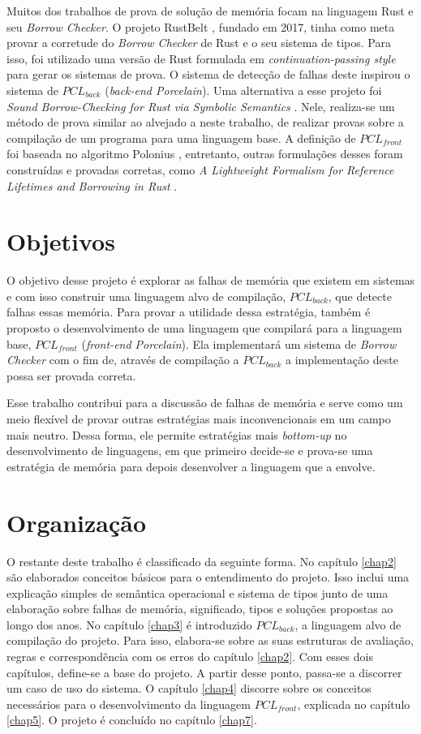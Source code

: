 Muitos dos trabalhos de prova de solução de memória focam na linguagem Rust e seu \emph{Borrow Checker}. O projeto RustBelt \cite{RUSTBELT}, fundado em 2017, tinha como meta provar a corretude do \emph{Borrow Checker} de Rust e o seu sistema de tipos. Para isso, foi utilizado uma versão de Rust formulada em \emph{continuation-passing style} para gerar os sistemas de prova. O sistema de detecção de falhas deste inspirou o sistema de $PCL_{back}$ (\emph{back-end Porcelain}). Uma alternativa a esse projeto foi \emph{Sound Borrow-Checking for Rust via Symbolic Semantics} \cite{RUSTSYMBOLIC}. Nele, realiza-se um método de prova similar ao alvejado a neste trabalho, de realizar provas sobre a compilação de um programa para uma linguagem base. A definição de $PCL_{front}$ foi baseada no algoritmo Polonius \cite{Stjerna1684081}, entretanto, outras formulações desses foram construídas e provadas corretas, como \emph{A Lightweight Formalism for Reference Lifetimes and Borrowing in Rust} \cite{RUSTFORMALISM}. 

\section{Objetivos}

O objetivo desse projeto é explorar as falhas de memória que existem em sistemas e com isso construir uma linguagem alvo de compilação, $PCL_{back}$, que detecte falhas essas memória. Para provar a utilidade dessa estratégia, também é proposto o desenvolvimento de uma linguagem que compilará para a linguagem base, $PCL_{front}$ (\emph{front-end Porcelain}). Ela implementará um sistema de \emph{Borrow Checker} com o fim de, através de compilação a $PCL_{back}$ a implementação deste possa ser provada correta.

Esse trabalho contribui para a discussão de falhas de memória e serve como um meio flexível de provar outras estratégias mais inconvencionais em um campo mais neutro. Dessa forma, ele permite estratégias mais \emph{bottom-up} no desenvolvimento de linguagens, em que primeiro decide-se e prova-se uma estratégia de memória para depois desenvolver a linguagem que a envolve.

\section{Organização}

O restante deste trabalho é classificado da seguinte forma. No capítulo \ref{chap2} são elaborados conceitos básicos para o entendimento do projeto. Isso inclui uma explicação simples de semântica operacional e sistema de tipos junto de uma elaboração sobre falhas de memória, significado, tipos e soluções propostas ao longo dos anos. No capítulo \ref{chap3} é introduzido $PCL_{back}$, a linguagem alvo de compilação do projeto. Para isso, elabora-se sobre as suas estruturas de avaliação, regras e correspondência com os erros do capítulo \ref{chap2}. Com esses dois capítulos, define-se a base do projeto. A partir desse ponto, passa-se a discorrer um caso de uso do sistema. O capítulo \ref{chap4} discorre sobre os conceitos necessários para o desenvolvimento da linguagem $PCL_{front}$, explicada no capítulo \ref{chap5}. O projeto é concluído no capítulo \ref{chap7}.
